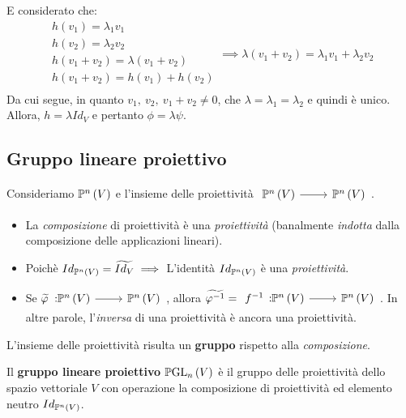 \begin{demonstration}
\begin{equation*}
\end{equation*}
E considerato che:
\begin{equation*}
	\begin{array}{l}
		h\left(v_1\right)=\lambda_1 v_1\\
		h\left(v_2\right)=\lambda_2 v_2\\
		h\left(v_1+v_2\right)=\lambda\left(v_1+v_2\right)\\
		h\left(v_1+v_2\right)=h\left(v_1\right)+h\left(v_2\right)\\
	\end{array}
	\implies \lambda\left(v_1+v_2\right)=\lambda_1 v_1+\lambda_2 v_2
\end{equation*}
Da cui segue, in quanto $v_1,\ v_2,\ v_1+v_2\neq 0$, che $\lambda=\lambda_1=\lambda_2$ e quindi è unico.\\
Allora, $h=\lambda Id_{V}$ e pertanto $\phi=\lambda \psi$.
\end{demonstration}
\subsection{Gruppo lineare proiettivo}
\begin{observe}
	Consideriamo $\proj{V}$ e l'insieme delle proiettività $\funz{\ }{\proj{V}}{\proj{V}}$.
	\begin{itemize}
		\item La \textit{composizione} di proiettività è una \textit{proiettività} (banalmente \textit{indotta} dalla composizione delle applicazioni lineari).
		\item Poichè $Id_{\proj{V}}=\widetilde{Id_V}\implies$ L'identità $Id_{\proj{V}}$ è una \textit{proiettività}.
		\item Se $\widetilde{\phi}\! \funz{\! }{\proj{V}}{\proj{V}}$, allora $\widetilde{\phi^{-1}}=\funz{f^{-1}}{\proj{V}}{\proj{V}}$. In altre parole, l'\textit{inversa} di una proiettività è ancora una proiettività.
	\end{itemize}
L'insieme delle proiettività risulta un \textbf{gruppo} rispetto alla \textit{composizione}.
\end{observe}
\begin{define}
Il \textbf{gruppo lineare proiettivo} $\projgl{V}$ è il gruppo delle proiettività dello spazio vettoriale $V$ con operazione la composizione di proiettività ed elemento neutro $Id_{\proj{V}}$. 
\end{define}
